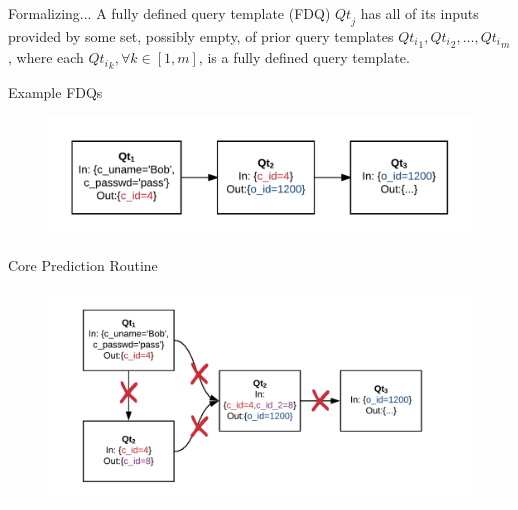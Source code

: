 \documentclass[10pt]{beamer}
\begin{document}
\begin{frame}[fragile]{Formalizing...}
A \alert{fully defined query template} (FDQ) $\mathit{Qt}_j$ has all of its inputs provided
by some set, possibly empty, of prior query templates $\mathit{Qt_i}_1, \mathit{Qt_i}_2, \ldots, \mathit{Qt_i}_m$,
where each $\mathit{Qt_i}_k, \forall k \in [1,m]$, is a fully defined query template.
\end{frame}

\begin{frame}[fragile]{Example FDQs}
    \begin{figure}
        \includegraphics[scale=0.22]{apollo_query_pipeline}
    \end{figure}
\end{frame}

\begin{frame}[fragile]{Core Prediction Routine}
    \begin{figure}
        \hspace*{-1cm}
        \includegraphics[scale=0.22]{apollo_cpr}
    \end{figure}
\end{frame}
\end{document}

